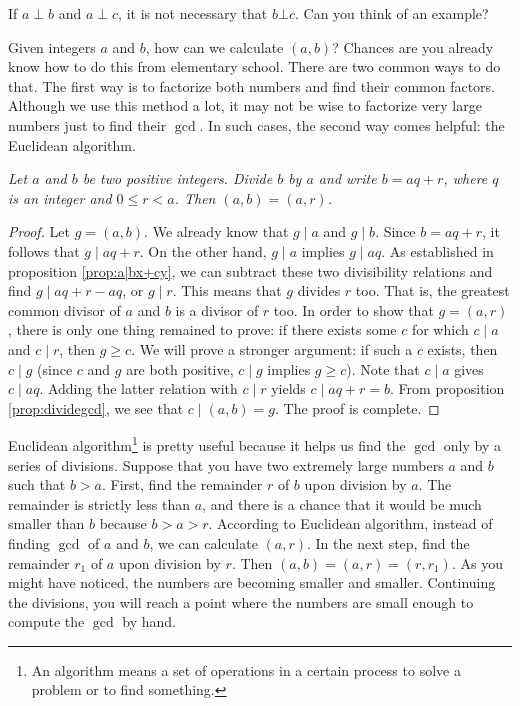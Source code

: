 \documentclass{subfile}
\begin{document}
	\begin{note}[2]
		If $a\perp b$ and $a\perp c$, it is not necessary that $b \bot c$. Can you think of an example?
	\end{note}

	Given integers $a$ and $b$, how can we calculate $(a,b)$? Chances are you already know how to do this from elementary school. There are two common ways to do that. The first way is to factorize both numbers and find their common factors. Although we use this method a lot, it may not be wise to factorize very large numbers just to find their $\gcd$. In such cases, the second way comes helpful: the Euclidean algorithm.

	\begin{theorem}\slshape
		Let $a$ and $b$ be two positive integers. Divide $b$ by $a$ and write $b=aq+r$, where $q$ is an integer and $0\leq r<a$. Then $(a,b)=(a,r)$.
	\end{theorem}

	\begin{proof}
		Let $g= (a,b)$. We already know that $g\mid a$ and $g\mid b$. Since $b=aq+r$, it follows that $g\mid aq+r$. On the other hand, $g\mid a$ implies $g\mid aq$. As established in proposition \eqref{prop:a|bx+cy}, we can subtract these two divisibility relations and find $g\mid aq+r-aq$, or $g\mid r$. This means that $g$ divides $r$ too. That is, the greatest common divisor of $a$ and $b$ is a divisor of $r$ too. In order to show that $g=(a,r)$, there is only one thing remained to prove: if there exists some $c$ for which $c\mid a$ and $c\mid r$, then $g \geq c$. We will prove a stronger argument: if such a $c$ exists, then $c\mid g$ (since $c$ and $g$ are both positive, $c\mid g$ implies $g \geq c$). Note that $c\mid a$ gives $c\mid aq$. Adding the latter relation with $c\mid r$ yields $c\mid aq+r = b$. From proposition \eqref{prop:dividegcd}, we see that $c\mid (a,b)=g$. The proof is complete.
	\end{proof}

	Euclidean algorithm\footnote{An algorithm means a set of operations in a certain process to solve a problem or to find something.} is pretty useful because it helps us find the $\gcd$ only by a series of divisions. Suppose that you have two extremely large numbers $a$ and $b$ such that $b>a$. First, find the remainder $r$ of $b$ upon division by $a$. The remainder is strictly less than $a$, and there is a chance that it would be much smaller than $b$ because $b>a>r$. According to Euclidean algorithm, instead of finding $\gcd$ of $a$ and $b$, we can calculate $(a,r)$. In the next step, find the remainder $r_1$ of $a$ upon division by $r$. Then $(a,b)=(a,r)=(r,r_1)$. As you might have noticed, the numbers are becoming smaller and smaller. Continuing the divisions, you will reach a point where the numbers are small enough to compute the $\gcd$ by hand.
\end{document}
